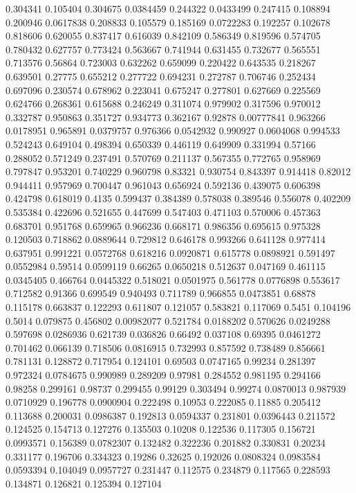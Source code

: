 0.304341 0.105404
0.304675 0.0384459
0.244322 0.0433499
0.247415 0.108894
0.200946 0.0617838
0.208833 0.105579
0.185169 0.0722283
0.192257 0.102678
0.818606 0.620055
0.837417 0.616039
0.842109 0.586349
0.819596 0.574705
0.780432 0.627757
0.773424 0.563667
0.741944 0.631455
0.732677 0.565551
0.713576 0.56864
0.723003 0.632262
0.659099 0.220422
0.643535 0.218267
0.639501 0.27775
0.655212 0.277722
0.694231 0.272787
0.706746 0.252434
0.697096 0.230574
0.678962 0.223041
0.675247 0.277801
0.627669 0.225569
0.624766 0.268361
0.615688 0.246249
0.311074 0.979902
0.317596 0.970012
0.332787 0.950863
0.351727 0.934773
0.362167 0.92878
0.00777841 0.963266
0.0178951 0.965891
0.0379757 0.976366
0.0542932 0.990927
0.0604068 0.994533
0.524243 0.649104
0.498394 0.650339
0.446119 0.649909
0.331994 0.57166
0.288052 0.571249
0.237491 0.570769
0.211137 0.567355
0.772765 0.958969
0.797847 0.953201
0.740229 0.960798
0.83321 0.930754
0.843397 0.914418
0.82012 0.944411
0.957969 0.700447
0.961043 0.656924
0.592136 0.439075
0.606398 0.424798
0.618019 0.4135
0.599437 0.384389
0.578038 0.389546
0.556078 0.402209
0.535384 0.422696
0.521655 0.447699
0.547403 0.471103
0.570006 0.457363
0.683701 0.951768
0.659965 0.966236
0.668171 0.986356
0.695615 0.975328
0.120503 0.718862
0.0889644 0.729812
0.646178 0.993266
0.641128 0.977414
0.637951 0.991221
0.0572768 0.618216
0.0920871 0.615778
0.0898921 0.591497
0.0552984 0.59514
0.0599119 0.66265
0.0650218 0.512637
0.047169 0.461115
0.0345405 0.466764
0.0445322 0.518021
0.0501975 0.561778
0.0776898 0.553617
0.712582 0.91366
0.699549 0.940493
0.711789 0.966855
0.0473851 0.68878
0.115178 0.663837
0.122293 0.611807
0.121057 0.583821
0.117069 0.5451
0.104196 0.5014
0.079875 0.456802
0.00982077 0.521784
0.0188202 0.570626
0.0249288 0.597698
0.0286936 0.621739
0.036826 0.66492
0.037108 0.69395
0.0461272 0.701462
0.066139 0.718506
0.0816915 0.732993
0.857592 0.738489
0.856661 0.781131
0.128872 0.717954
0.124101 0.69503
0.0747165 0.99234
0.281397 0.972324
0.0784675 0.990989
0.289209 0.97981
0.284552 0.981195
0.294166 0.98258
0.299161 0.98737
0.299455 0.99129
0.303494 0.99274
0.0870013 0.987939
0.0710929 0.196778
0.0900904 0.222498
0.10953 0.222085
0.11885 0.205412
0.113688 0.200031
0.0986387 0.192813
0.0594337 0.231801
0.0396443 0.211572
0.124525 0.154713
0.127276 0.135503
0.10208 0.122536
0.117305 0.156721
0.0993571 0.156389
0.0782307 0.132482
0.322236 0.201882
0.330831 0.20234
0.331177 0.196706
0.334323 0.19286
0.32625 0.192026
0.0808324 0.0983584
0.0593394 0.104049
0.0957727 0.231447
0.112575 0.234879
0.117565 0.228593
0.134871 0.126821
0.125394 0.127104
